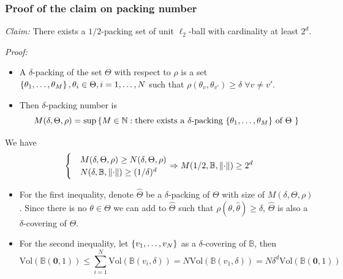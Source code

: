 \documentclass[10pt,xcolor={usenames,dvipsnames,table},aspectratio=169]{beamer}
\begin{document}
\begin{frame}
    \frametitle{Proof of the claim on packing number}
\textit{Claim:} There exists a $1/2$-packing set of unit $\ell_2$-ball with cardinality at least $2^{d}$.

\textit{Proof:}
    \begin{itemize}
        \item A $\delta$-packing of the set $\Theta$ with respect to $\rho$ is a set 
    $\left\{\theta_1, \ldots , \theta_M\right\}, \theta_i \in \Theta, i=1,\ldots , N$ such that $\rho(\theta_v, \theta_{v'}) \geq \delta \; \forall v \neq v'$.
    \item Then $\delta$-packing number is 
    \[
    M(\delta, \Theta, \rho) = \sup \left\{M \in \mathbb{N}: \text{there exists a $\delta$-packing $\left\{\theta_1, \ldots , \theta_M\right\}$ of $\Theta$ }\right\}
    \] 

    \end{itemize}
    We have 
    \[
    \begin{cases}
        &M(\delta, \Theta, \rho) \geq N(\delta, \Theta, \rho) \\
        &N(\delta, \mathbb{B}, \left\lVert\cdot\right\rVert) \geq (1/\delta)^{d}
    \end{cases}
    \Rightarrow 
   M(1/2, \mathbb{B}, \left\lVert\cdot\right\rVert) \geq 2^{d}
    \] 
    \begin{itemize}
        \item For the first inequality, denote $\widehat{\Theta}$ be a $\delta$-packing of $\Theta$ with size of $M(\delta, \Theta, \rho)$.  Since there is no $\theta \in \Theta$ we can add to $\widehat{\Theta}$ such that $\rho(\theta, \widehat{\theta}) \geq \delta$, $ \widehat{\Theta}$ is also a $\delta$-covering of $\Theta$.
        \item For the second inequality, let $\left\{v_1, \ldots , v_N\right\}$ as a $\delta$-covering of $\mathbb{B}$, then
            \[
            \text{Vol}(\mathbb{B}(\bm{0}, 1)) \leq \sum^{N}_{i=1} \text{Vol}(\mathbb{B}(v_i, \delta))
            = N \text{Vol}(\mathbb{B}(v_1, \delta)) = N \delta^{d} \text{Vol}(\mathbb{B}(\bm{0}, 1))
            \] 
    \end{itemize}
\end{frame}
\end{document}
